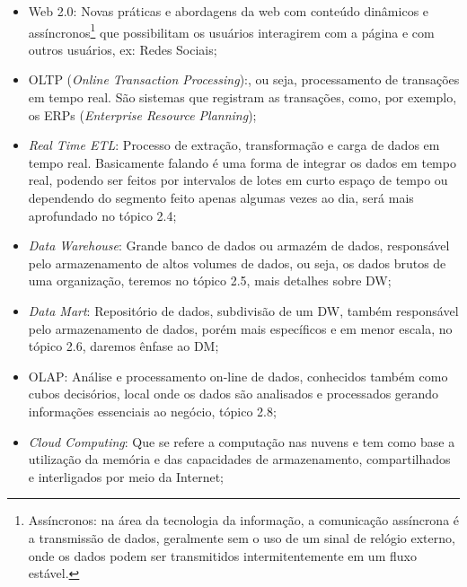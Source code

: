 \begin{itemize}

    \item Web 2.0: Novas pr\'{a}ticas e abordagens da web com conteúdo dinâmicos e ass\'{i}ncronos\footnote{Ass\'{i}ncronos: na \'{a}rea da tecnologia da informa\c{c}\~{a}o, a comunica\c{c}\~{a}o ass\'{i}ncrona \'{e} a transmiss\~{a}o de dados, geralmente sem o uso de um sinal de rel\'{o}gio externo, onde os dados podem ser transmitidos intermitentemente em um fluxo est\'{a}vel.} que possibilitam os usu\'{a}rios interagirem com a p\'{a}gina e com outros usu\'{a}rios, ex: Redes Sociais;
    
    \item OLTP (\textit{Online Transaction Processing}):, ou seja, processamento de transa\c{c}\~{o}es em tempo real. S\~{a}o sistemas que registram as transa\c{c}\~{o}es, como, por exemplo, os ERPs (\textit{Enterprise Resource Planning});
    
    \item \textit{Real Time ETL}: Processo de extra\c{c}\~{a}o, transforma\c{c}\~{a}o e carga de dados em tempo real. Basicamente falando \'{e} uma forma de integrar os dados em tempo real, podendo ser feitos por intervalos de lotes em curto espa\c{c}o de tempo ou dependendo do segmento feito apenas algumas vezes ao dia, ser\'{a} mais aprofundado no t\'{o}pico 2.4;
    
    \item \textit{Data Warehouse}: Grande banco de dados ou armaz\'{e}m de dados, respons\'{a}vel pelo armazenamento de altos volumes de dados, ou seja, os dados brutos de uma organiza\c{c}\~{a}o, teremos no t\'{o}pico 2.5, mais detalhes sobre DW; 
    
    \item \textit{Data Mart}: Reposit\'{o}rio de dados, subdivis\~{a}o de um DW, tamb\'{e}m respons\'{a}vel pelo armazenamento de dados, por\'{e}m mais espec\'{i}ficos e em menor escala, no t\'{o}pico 2.6, daremos \^{e}nfase ao DM;
    
    \item OLAP: An\'{a}lise e processamento on-line de dados, conhecidos tamb\'{e}m como cubos decis\'{o}rios, local onde os dados s\~{a}o analisados e processados gerando informa\c{c}\~{o}es essenciais ao neg\'{o}cio, t\'{o}pico 2.8; 
    
    \item \textit{Cloud Computing}: Que se refere a computa\c{c}\~{a}o nas nuvens e tem como base a utiliza\c{c}\~{a}o da mem\'{o}ria e das capacidades de armazenamento, compartilhados e interligados por meio da Internet;
    

\end{itemize}
